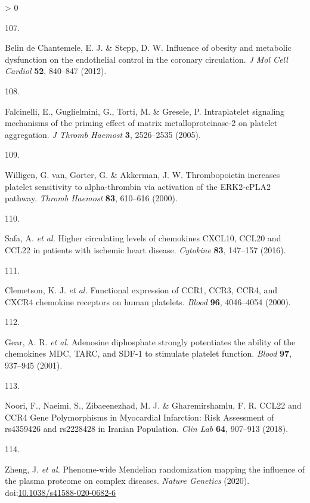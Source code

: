 \documentclass[11pt,twoside]{bristolthesis}
\newlength{\cslhangindent}
\newlength{\csllabelwidth}
\newenvironment{CSLReferences}[2] %
 {%
  \setlength{\parindent}{0pt}
  \ifodd #1 \everypar{\setlength{\hangindent}{\cslhangindent}}\ignorespaces\fi
  \ifnum #2 > 0
  \setlength{\parskip}{#2\baselineskip}
  \fi
 }%
 {}
\newcommand{\CSLLeftMargin}[1]{\parbox[t]{\csllabelwidth}{#1}}
\newcommand{\CSLRightInline}[1]{\parbox[t]{\linewidth - \csllabelwidth}{#1}\break}
\begin{document}
\begin{CSLReferences}{0}{0}
\leavevmode\hypertarget{ref-BelindeChantemele2012a}{}%
\CSLLeftMargin{107. }
\CSLRightInline{Belin de Chantemele, E. J. \& Stepp, D. W. {Influence of obesity and metabolic dysfunction on the endothelial control in the coronary circulation}. \emph{J Mol Cell Cardiol} \textbf{52}, 840--847 (2012).}

\leavevmode\hypertarget{ref-Falcinelli2005}{}%
\CSLLeftMargin{108. }
\CSLRightInline{Falcinelli, E., Guglielmini, G., Torti, M. \& Gresele, P. {Intraplatelet signaling mechanisms of the priming effect of matrix metalloproteinase-2 on platelet aggregation}. \emph{J Thromb Haemost} \textbf{3}, 2526--2535 (2005).}

\leavevmode\hypertarget{ref-VanWilligen2000}{}%
\CSLLeftMargin{109. }
\CSLRightInline{Willigen, G. van, Gorter, G. \& Akkerman, J. W. {Thrombopoietin increases platelet sensitivity to alpha-thrombin via activation of the ERK2-cPLA2 pathway}. \emph{Thromb Haemost} \textbf{83}, 610--616 (2000).}

\leavevmode\hypertarget{ref-Safa2016}{}%
\CSLLeftMargin{110. }
\CSLRightInline{Safa, A. \emph{et al.} {Higher circulating levels of chemokines CXCL10, CCL20 and CCL22 in patients with ischemic heart disease}. \emph{Cytokine} \textbf{83}, 147--157 (2016).}

\leavevmode\hypertarget{ref-Clemetson2000}{}%
\CSLLeftMargin{111. }
\CSLRightInline{Clemetson, K. J. \emph{et al.} {Functional expression of CCR1, CCR3, CCR4, and CXCR4 chemokine receptors on human platelets}. \emph{Blood} \textbf{96}, 4046--4054 (2000).}

\leavevmode\hypertarget{ref-Gear2001}{}%
\CSLLeftMargin{112. }
\CSLRightInline{Gear, A. R. \emph{et al.} {Adenosine diphosphate strongly potentiates the ability of the chemokines MDC, TARC, and SDF-1 to stimulate platelet function}. \emph{Blood} \textbf{97}, 937--945 (2001).}

\leavevmode\hypertarget{ref-Noori2018}{}%
\CSLLeftMargin{113. }
\CSLRightInline{Noori, F., Naeimi, S., Zibaeenezhad, M. J. \& Gharemirshamlu, F. R. {CCL22 and CCR4 Gene Polymorphisms in Myocardial Infarction: Risk Assessment of rs4359426 and rs2228428 in Iranian Population}. \emph{Clin Lab} \textbf{64}, 907--913 (2018).}

\leavevmode\hypertarget{ref-Zheng2020}{}%
\CSLLeftMargin{114. }
\CSLRightInline{Zheng, J. \emph{et al.} {Phenome-wide Mendelian randomization mapping the influence of the plasma proteome on complex diseases}. \emph{Nature Genetics} (2020). doi:\href{https://doi.org/10.1038/s41588-020-0682-6}{10.1038/s41588-020-0682-6}}


\end{CSLReferences}
\end{document}

